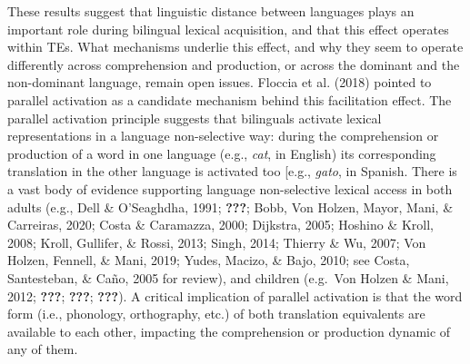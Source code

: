 \documentclass[
  english,
  man,man,floatsintext]{apa6}
\begin{document}
These results suggest that linguistic distance between languages plays an important role during bilingual lexical acquisition, and that this effect operates within TEs. What mechanisms underlie this effect, and why they seem to operate differently across comprehension and production, or across the dominant and the non-dominant language, remain open issues. Floccia et al. (2018) pointed to parallel activation as a candidate mechanism behind this facilitation effect. The parallel activation principle suggests that bilinguals activate lexical representations in a language non-selective way: during the comprehension or production of a word in one language (e.g., \emph{cat}, in English) its corresponding translation in the other language is activated too {[}e.g., \emph{gato}, in Spanish. There is a vast body of evidence supporting language non-selective lexical access in both adults (e.g., Dell \& O'Seaghdha, 1991; {\textbf{???}}; Bobb, Von Holzen, Mayor, Mani, \& Carreiras, 2020; Costa \& Caramazza, 2000; Dijkstra, 2005; Hoshino \& Kroll, 2008; Kroll, Gullifer, \& Rossi, 2013; Singh, 2014; Thierry \& Wu, 2007; Von Holzen, Fennell, \& Mani, 2019; Yudes, Macizo, \& Bajo, 2010; see Costa, Santesteban, \& Caño, 2005 for review), and children (e.g.~Von Holzen \& Mani, 2012; {\textbf{???}}; {\textbf{???}}; {\textbf{???}}). A critical implication of parallel activation is that the word form (i.e., phonology, orthography, etc.) of both translation equivalents are available to each other, impacting the comprehension or production dynamic of any of them.
\end{document}
